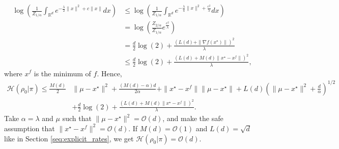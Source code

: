 \documentclass[final,12pt]{colt2018}
\begin{document}
\begin{align*}
\log\left(\frac{1}{Z_{1/\alpha}} \int_{\mathbb{R}^d} e^{-\frac{\lambda}{2}\|x\|^2+ c\|x\|} dx \right) &\leq \log\left(\frac{1}{Z_{1/\alpha}} \int_{\mathbb{R}^d} e^{-\frac{\lambda}{4}\|x\|^2+ \frac{c^2}{\lambda}} dx \right) \\
& = \log\left(\frac{Z_{2/\alpha}}{Z_{1/\alpha}} e^{\frac{c^2}{\lambda}}\right)\\
& = \frac{d}{2}\log(2) + \frac{(L(d)+\|\nabla f(x^\star)\|)^2}{\lambda}\\
& \leq \frac{d}{2}\log(2) + \frac{(L(d)+M(d)\|x^\star-x^f\|)^2}{\lambda},
\end{align*}
where $x^f$ is the minimum of $f$. Hence,
\begin{align*}
\mathcal{H}(\rho_0 | \pi) \leq  \frac{M(d)}{2}&\|\mu -x^\star\|^2 +  \frac{(M(d)-\alpha) d}{2\alpha} +\|x^\star-x^f\|\|\mu-x^\star\| + L(d)\left(\|\mu-x^\star\|^2 +\frac{d}{\alpha}\right)^{1/2} \\
&+ \frac{d}{2}\log(2) + \frac{(L(d)+M(d)\|x^\star-x^f\|)^2}{\lambda}. 
\end{align*}
Take $\alpha = \lambda$ and $\mu$ such that $\|\mu -x^\star\|^2 = \mathcal{O}(d)$, and make the safe assumption that $\|x^\star-x^f\|^2 = \mathcal{O}(d)$. If $M(d) = \mathcal{O}(1)$ and $L(d)=\sqrt{d}$ like in Section \ref{seq:explicit_rates}, we get $\mathcal{H}(\rho_0 | \pi)  = \mathcal{O}(d)$. 
\end{document}
